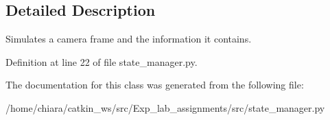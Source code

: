 \subsection{Detailed Description}
Simulates a camera frame and the information it contains. 



Definition at line 22 of file state\+\_\+manager.\+py.



The documentation for this class was generated from the following file\+:\begin{DoxyCompactItemize}
\item 
/home/chiara/catkin\+\_\+ws/src/\+Exp\+\_\+lab\+\_\+assignments/src/state\+\_\+manager.\+py\end{DoxyCompactItemize}
